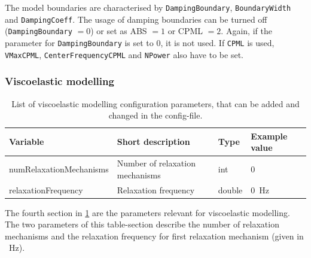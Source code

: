\documentclass[pdftex,a4paper,parskip,listof=totoc,bibliography=totoc,onehalfspacing,12pt]{scrreprt}
\begin{document}
The model boundaries are characterised by \verb+DampingBoundary+, \verb+BoundaryWidth+ and \verb+DampingCoeff+. 
The usage of damping boundaries can be turned off (\verb+DampingBoundary+ $=0$) or set as ABS $=1$ or CPML $=2$. Again, if the parameter for \verb+DampingBoundary+ is set to 0, it is not used. 
If \verb+CPML+ is used, \verb+VMaxCPML+, \verb+CenterFrequencyCPML+ and \verb+NPower+ also have to be set. 

\subsubsection{Viscoelastic modelling}
\begin{table}[h!]
\caption[List of viscoelastic modelling configuration parameters.]{List of viscoelastic modelling configuration parameters, that can be added and changed in the config-file.}\label{tab:config_visco}
\centering
\begin{adjustbox}{width=1\textwidth,center=\textwidth}
	\begin{tabular}{llll}
	\toprule
	Variable & Short description & Type & Example value \\
	\midrule
	numRelaxationMechanisms & Number of relaxation mechanisms & int & \num{0}\\
	relaxationFrequency& Relaxation frequency& double & \SI{0}{Hz}\\
	\bottomrule
	\end{tabular}
	\end{adjustbox}
\end{table}
The fourth section in \ref{tab:config_visco} are the parameters relevant for viscoelastic modelling. The two parameters of this table-section describe the number of relaxation mechanisms and the relaxation frequency for first relaxation mechanism (given in \SI{}{Hz}).
\end{document}
